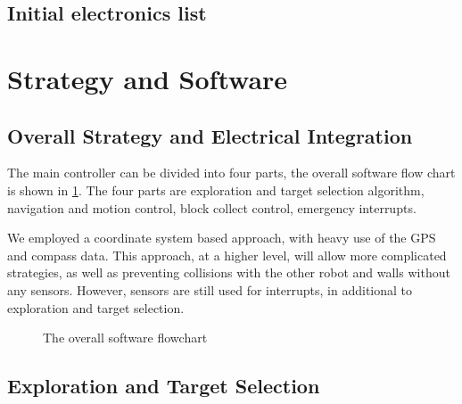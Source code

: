 

\subsection{Initial electronics list}







\section{Strategy and Software}



\subsection{Overall Strategy and Electrical Integration}
\label{sec:software_flow_chart}

The main controller can be divided into four parts, the overall software flow chart is shown in \cref{fig:flow_overall}. The four parts are exploration and target selection algorithm, navigation and motion control, block collect control, emergency interrupts. 

We employed a coordinate system based approach, with heavy use of the GPS and compass data. This approach, at a higher level, will allow more complicated strategies, as well as preventing collisions with the other robot and walls without any sensors. However, sensors are still used for interrupts, in additional to exploration and target selection.











\newpage
\begin{figure}[H]
    \centering
    
    \caption{The overall software flowchart}
    \label{fig:flow_overall}
\end{figure}
\newpage



\subsection{Exploration and Target Selection}\label{subsec:target}

